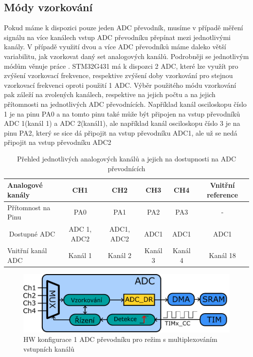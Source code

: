 \subsection{Módy vzorkování}
\label{ch:ADCmux}
Pokud máme k dispozici pouze jeden ADC převodník, musíme v případě měření signálu na více kanálech vstup ADC převodníku přepínat mezi jednotlivými kanály. V případě využití dvou a více ADC převodníků máme daleko větší variabilitu, jak vzorkovat daný set analogových kanálů. Podrobněji se jednotlivým módům věnuje práce \cite{DujavaDIP}. STM32G431 má k dispozci 
2 ADC, které lze využít pro zvýšení vzorkovací frekvence, respektive zvýšení doby vzorkování pro stejnou vzorkovací frekvenci oproti použití 1 ADC. Výběr použitého módu vzorkování pak záleží na zvolených kanálech, respektive na jejich počtu a na jejich přítomnosti na jednotlivých ADC převodnících. Například kanál osciloskopu číslo 1 je na pinu PA0 a na tomto pinu také může být připojen na vstup převodníků ADC 1(kanál 1) a ADC 2(kanál1), ale například kanál osciloskopu číslo 3 je na pinu PA2, který se sice dá připojit na vstup převodníku ADC1, ale už se nedá připojit na vstup převodníku ADC2
\begin{table}[]
	\begin{tabular}{lccccc}
		Analogové kanály                & CH1         & CH2        & CH3     & CH4     & Vnitřní reference \\ \hline
		Přítomnost na Pinu               & PA0         & PA1        & PA2     & PA3     & -                 \\ \hline
		\multicolumn{1}{c}{Dostupné ADC} & ADC 1, ADC2 & ADC1, ADC2 & ADC1    & ADC1    & ADC1              \\ \hline
		Vnitřní kanál ADC                & Kanál 1     & Kanál 2    & Kanál 3 & Kanál 4 & Kanál 18         
	\end{tabular}
	\caption{Přehled jednotlivých analogových kanálů a jejich na dostupnosti na ADC převodnících}
	\label{tab:kanalyADC}
\end{table}

\begin{figure}[H]
	\centering
	\includegraphics[width=0.7\linewidth]{Figs/Diagrams/SVG/ADC_SingleMux.pdf}
	\caption{HW konfigurace 1 ADC převodníku pro režim s multiplexováním vstupních kanálů}
	\label{HW konfigurace v případě "independent interleaved" módu}
\end{figure}

